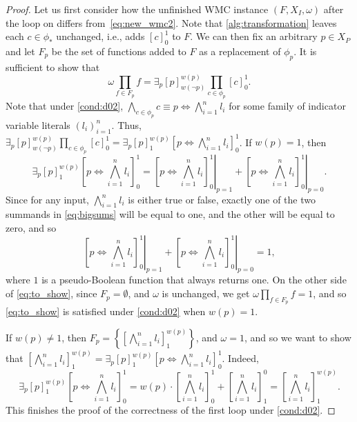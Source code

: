 \begin{proof}
  Let us first consider how the unfinished WMC instance $(F, X_I, \omega)$ after
  the loop on  differs
  from~\eqref{eq:new_wmc2}. Note that \cref{alg:transformation} leaves each
  $c \in \phi_*$ unchanged, i.e., adds ${[c]}_0^1$ to $F$. We can then fix an
  arbitrary $p \in X_P$ and let $F_p$ be the set of functions added to $F$ as a
  replacement of $\phi_p$. It is sufficient to show that
  \begin{equation} \label{eq:to_show}
    \omega \prod_{f \in F_p} f = \exists_p [p]_{w(\neg p)}^{w(p)} \prod_{c \in \phi_p} {[c]}_0^1.
  \end{equation}
  Note that under \cref{cond:d02},
  $\bigwedge_{c \in \phi_p} c \equiv p \Leftrightarrow \bigwedge_{i=1}^n l_i$
  for some family of indicator variable literals ${(l_i)}_{i=1}^n$. Thus,
  $\exists_p {[p]}_{w(\neg p)}^{w(p)} \prod_{c \in \phi_p} {[c]}_0^1 = \exists_p {[p]}_1^{w(p)} \left[ p \Leftrightarrow \bigwedge_{i=1}^n l_i \right]_0^1$.
  If $w(p) = 1$, then
  \begin{equation} \label{eq:bigsums}
    \exists_p {[p]}_1^{w(p)} \left[ p \Leftrightarrow \bigwedge_{i=1}^n l_i \right]_0^1 = \left.\left[ p \Leftrightarrow \bigwedge_{i=1}^n l_i \right]_0^1\right|_{p=1} + \left.\left[ p \Leftrightarrow \bigwedge_{i=1}^n l_i \right]_0^1\right|_{p=0}.
  \end{equation}
  Since for any input, $\bigwedge_{i=1}^n l_i$ is either true or false, exactly
  one of the two summands in \cref{eq:bigsums} will be equal to one, and the
  other will be equal to zero, and so
  \[
    \left.\left[ p \Leftrightarrow \bigwedge_{i=1}^n l_i \right]_0^1\right|_{p=1} + \left.\left[ p \Leftrightarrow \bigwedge_{i=1}^n l_i \right]_0^1\right|_{p=0} = 1,
  \]
  where $1$ is a pseudo-Boolean function that always returns one. On the other
  side of \cref{eq:to_show}, since $F_p = \emptyset$, and $\omega$ is unchanged,
  we get $\omega\prod_{f \in F_p} f = 1$, and so \cref{eq:to_show} is satisfied
  under \cref{cond:d02} when $w(p) = 1$.

  If $w(p) \ne 1$, then $F_p = \left\{ \left[ \bigwedge_{i = 1}^n l_i
    \right]_1^{w(p)} \right\}$, and $\omega = 1$, and so we want to show that
  $\left[ \bigwedge_{i = 1}^n l_i \right]_1^{w(p)} = \exists_p [p]_1^{w(p)}
  \left[ p \Leftrightarrow \bigwedge_{i=1}^n l_i \right]_0^1$. Indeed,
  \[
  \exists_p [p]_1^{w(p)} \left[ p \Leftrightarrow \bigwedge_{i=1}^n l_i \right]_0^1 = w(p) \cdot \left[ \bigwedge_{i=1}^n l_i \right]_0^1 + \left[\bigwedge_{i=1}^n l_i \right]_1^0 = \left[ \bigwedge_{i=1}^n l_i \right]_1^{w(p)}.
  \]
  This finishes the proof of the correctness of the first loop under \cref{cond:d02}.


\end{proof}
